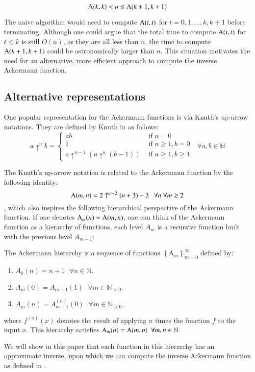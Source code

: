 \begin{equation}
\text{A}(k, k) < n \le \text{A}(k+1, k+1)
\end{equation}

The naive algorithm would need to compute $\text{A}(t, t)$ for $t = 0, 1, \ldots, k, k+1$ before terminating. Although one could argue that the total time to compute $\text{A}(t, t)$ for $t\le k$ is still $O(n)$, as they are all less than $n$, the time to compute $\text{A}(k+1, k+1)$ could be astronomically larger than $n$. This situation motivates the need for an alternative, more efficient approach to compute the inverse Ackermann function.

\subsection{Alternative representations}

One popular representation for the Ackermann functions is via Knuth's up-arrow notations. They are defined by Knuth in \cite{knuth} as follows:
\begin{equation}
a\uparrow^n b = \begin{cases}
ab & \text{ if } n = 0 \\ 1 & \text{ if } n \ge 1, b = 0 \\
a \uparrow^{n-1} (a \uparrow^n (b - 1)) & \text{ if } n \ge 1, b \ge 1
\end{cases} \ \ \ \forall a, b \in \mathbb{N}
\end{equation}

The Knuth's up-arrow notation is related to the Ackermann function by the following identity:
\begin{equation}
\text{A}(m, n) = 2 \uparrow^{m-2} (n + 3) - 3 \ \ \ \forall n \ \forall m \ge 2
\end{equation}
, which also inspires the following hierarchical perspective of the Ackermann function.
If one denotes $\text{A}_m(n) = \text{A}(m, n)$, one can think of the Ackermann function as a hierarchy of functions, each level $A_m$ is a recursive function built with the previous level $A_{m-1}$:

\begin{defn} \label{defn: ack_hier}
	The Ackermann hierarchy is a sequence of functions $\left\{\text{A}_m\right\}_{m=0}^\infty$ defined by:
	\begin{enumerate}
		\item $A_0(n) = n + 1 \ \ \ \forall n\in \mathbb{N}$.
		\item $A_m(0) = A_{m-1}(1) \ \ \ \forall m\in \mathbb{N}_{>0}$.
		\item $A_{m}(n) = A_{m-1}^{(n)}(0) \ \ \ \forall m\in \mathbb{N}_{>0}$,
	\end{enumerate}
	\noindent where $f^{(n)}(x)$ denotes the result of applying $n$ times the function $f$ to the input $x$. This hierarchy satisfies $\text{A}_m(n) = \text{A}(m, n) \ \ \forall m, n\in \mathbb{N}$.
\end{defn}

We will show in this paper that each function in this hierarchy has an approximate inverse, upon which we can compute the inverse Ackermann function as defined in .